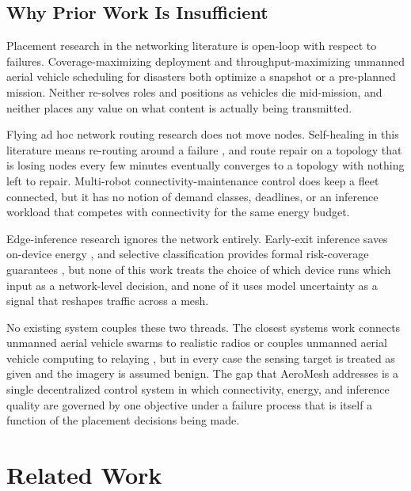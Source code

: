 \documentclass[drones,article,submit,moreauthors]{Definitions/mdpi}
\begin{document}
\subsection{Why Prior Work Is Insufficient}

Placement research in the networking literature is open-loop with respect to failures. Coverage-maximizing deployment \cite{mozaffari2016efficient} and throughput-maximizing unmanned aerial vehicle scheduling for disasters \cite{chiaraviglio2019optimal} both optimize a snapshot or a pre-planned mission. Neither re-solves roles and positions as vehicles die mid-mission, and neither places any value on what content is actually being transmitted.

Flying ad hoc network routing research does not move nodes. Self-healing in this literature means re-routing around a failure \cite{bekmezci2013flying,lakew2020routing,khan2020routing,arafat2019routing,biomo2014enhanced}, and route repair on a topology that is losing nodes every few minutes eventually converges to a topology with nothing left to repair. Multi-robot connectivity-maintenance control \cite{li2023selfhealing,capelli2022network,pan2024distributed} does keep a fleet connected, but it has no notion of demand classes, deadlines, or an inference workload that competes with connectivity for the same energy budget.

Edge-inference research ignores the network entirely. Early-exit inference saves on-device energy \cite{teerapittayanon2016branchynet,laskaridis2021adaptive,matsubara2022split}, and selective classification provides formal risk-coverage guarantees \cite{geifman2017selective,geifman2019selectivenet}, but none of this work treats the choice of which device runs which input as a network-level decision, and none of it uses model uncertainty as a signal that reshapes traffic across a mesh.

No existing system couples these two threads. The closest systems work connects unmanned aerial vehicle swarms to realistic radios \cite{tardioli2024decentralized,fabra2018ardusim} or couples unmanned aerial vehicle computing to relaying \cite{khalid2024computational}, but in every case the sensing target is treated as given and the imagery is assumed benign. The gap that AeroMesh addresses is a single decentralized control system in which connectivity, energy, and inference quality are governed by one objective under a failure process that is itself a function of the placement decisions being made.

\section{Related Work}
\label{sec:related}
\end{document}

